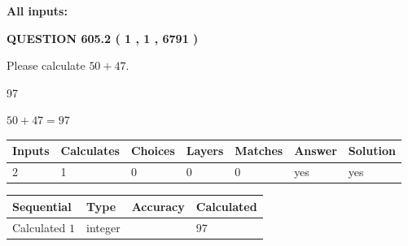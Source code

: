 \documentclass[12pt]{article}
\begin{document}
   
   
   
\noindent{}
   
   
   
   
\noindent\vspace{0.1in}\hspace{-0.08in} {\textbf{\Large{All inputs: }}}
   
   
  
\vspace{0.2in}
  
{\textbf{\Large{QUESTION
605.2 
 ( 1 , 1 , 6791 )
}}}
  
  
 
Please calculate $ %
50 +  %
47 $.
 
 
 
\noindent{}
 
 

97
 
 
\noindent{}
 
 

 
 
 
\noindent{}
 
 

$ %
50 +  %
47=   %
97$
 
 
\noindent{}
 
 

 
   
   
   
   
\noindent\begin{tabular}{|l|l|l|l|l|l|l|}
 \hline
Inputs & Calculates & Choices & Layers & Matches & Answer & Solution \\ \hline
 2  & 
 1  & 
 0
  & 
 0  & 
 0  & 
  yes & 
  yes 
  \\ \hline
 \end{tabular}
   
   
   
   
\noindent{}
   
   
  
  
\noindent\begin{tabular}{|l|l|l|l|}
\hline
 Sequential & Type & Accuracy & Calculated \\ 
\hline
 
 
  Calculated $  1 $ & integer &  & 
  $ 97 $ 
 \\  \hline  
 \end{tabular}
   
\end{document}
